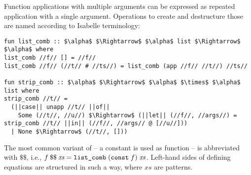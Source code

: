 Function applications with multiple arguments can be expressed as repeated application with a single argument.
Operations to create and destructure those are named according to Isabelle terminology:
%
\begin{lstlisting}[language=Isabelle]
fun list_comb :: $\alpha$ $\Rightarrow$ $\alpha$ list $\Rightarrow$ $\alpha$ where
list_comb //f// [] = //f//
list_comb //f// (//t// # //ts//) = list_comb (app //f// //t//) //ts//

fun strip_comb :: $\alpha$ $\Rightarrow$ $\alpha$ $\times$ $\alpha$ list where
strip_comb //t// =
  (||case|| unapp //t// ||of||
    Some (//t//, //u//) $\Rightarrow$ (||let|| (//f//, //args//) = strip_comb //t// ||in|| (//f//, //args// @ [//u//]))
  | None $\Rightarrow$ (//t//, []))
\end{lstlisting}
%
The most common variant of  -- a constant is used as function -- is abbreviated with $\$\$$, i.e., $f\mathbin{\$\$}\mathit{xs} = \texttt{\textup{list\_comb}}\;(\texttt{\textup{const}}\;f)\;\mathit{xs}$.
Left-hand sides of defining equations are structured in such a way, where $\mathit{xs}$ are patterns.
%

